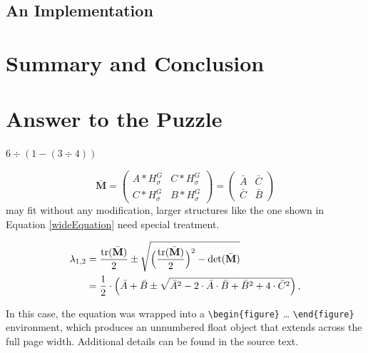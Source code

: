 \documentclass[english,smartquotes]{hgbarticle}
\begin{document}
\subsection{An Implementation}
\section{Summary and Conclusion}

\section{Answer to the Puzzle}
\begin{rotanswer}
$6\div(1-(3\div 4))$
\end{rotanswer}

%
\begin{equation}
\bar{\mathbf{M}} =  
\begin{pmatrix}
	A \ast H^{G}_{\sigma}   & C \ast H^{G}_{\sigma} \\
	C \ast H^{G}_{\sigma}   & B \ast H^{G}_{\sigma} 
\end{pmatrix}
=
\begin{pmatrix}
	\bar{A}   & \bar{C} \\
	\bar{C}   & \bar{B} 
\end{pmatrix}
\end{equation}
%
may fit without any modification, larger structures like the one shown in
Equation \ref{wideEquation} need special treatment.
%
\begin{figure}[t]
	\begin{equation}
		\begin{split}
			\lambda_{1,2}
			&= \frac{\mathrm{tr}(\bar{\mathbf{M}})}{2} \pm \sqrt{\Bigl
			(\frac{\mathrm{tr}(\bar{\mathbf{M}})}{2}\Bigr)^2
			- \mathrm{det}(\bar{\mathbf{M}})}  \\
			&= \frac{1}{2} \cdot \left( \bar{A} + \bar{B} \pm \sqrt{\bar{A}^2 -
			2 \cdot \bar{A} \cdot \bar{B} + \bar{B}^2 + 4 \cdot \bar{C}^2}
			\right)
			,
		\end{split}
		\label{wideEquation}
	\end{equation}
\end{figure}
%
In this case, the equation was wrapped into a \verb!\begin{figure}! \ldots
\verb!\end{figure}! environment, which produces an unnumbered float object
that extends across the full page width. Additional details can be found in
the source text.
\end{document}
